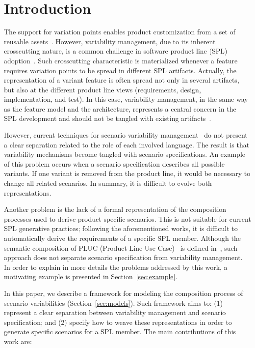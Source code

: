 \documentclass{llncs}
\begin{document}
\section{Introduction}
%
The support for variation points enables product
customization from a set of reusable
assets~\cite{phol-spl-book}. However, variability management, due to
its inherent crosscutting nature, is a common challenge in software
product line (SPL) adoption~\cite{northrop-spl-book,phol-spl-book}.
Such crosscutting characteristic is materialized whenever a feature
requires variation points to be spread in different SPL artifacts. Actually, 
the representation of a variant feature is often spread not only 
in several artifacts, but also at the different product line views (requirements, 
design, implementation, and test). In this case, variability management, in 
the same way as the feature model and the architecture, represents a central concern in the SPL 
development and should not be tangled with existing artifacts~\cite{phol-spl-book}.   

However, current techniques for scenario variability 
management~\cite{favaro-icsr-98,bertolino-esec-2003,eriksson-splc-2005} do 
not present a clear separation related to the role of each involved language. 
The result is that variability mechanisms become tangled with scenario specifications. 
An example of this problem occurs when a scenario specification describes all possible variants. 
If one variant is removed from the product line, it would be necessary to change all related scenarios. 
In summary, it is difficult to evolve both representations. 

Another problem is the lack of a formal representation of the composition processes used 
to derive product specific scenarios. This is not suitable for current SPL generative 
practices; following the aforementioned works, it is difficult to automatically derive 
the requirements of a specific SPL member.  Although  the semantic composition of PLUC (Product 
Line Use Case)~\cite{bertolino-esec-2003} is defined in~\cite{fantechi-splc-2004}, such approach 
does not separate scenario specification from variability management. In order to explain in more details 
the problems addressed by this work, a motivating example is presented  in Section~\ref{sec:example}.  

In this paper, we describe a framework for modeling the composition 
process of scenario variabilities (Section~\ref{sec:models}). 
Such framework aims to: (1) represent a clear separation between variability management 
and scenario specification; and (2) specify how to weave these representations in order to generate
specific scenarios for a SPL member. The main contributions of this work are:
\end{document}
